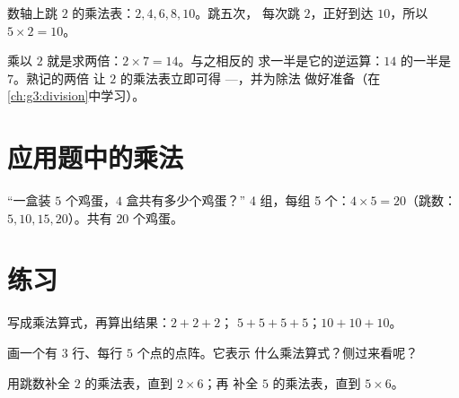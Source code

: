 \begin{omfigure}

{\small 数轴上跳 $2$ 的乘法表：$2, 4, 6, 8, 10$。跳五次，
每次跳 $2$，正好到达 $10$，所以 $5 \times 2 = 10$。}
\end{omfigure}

\begin{example}[两倍与一半]\label{ex:g2:mult:double}
乘以 $2$ 就是求两倍：$2 \times 7 = 14$。与之相反的
求一半是它的逆运算：$14$ 的一半是 $7$。熟记的两倍
让 $2$ 的乘法表立即可得 ---，并为除法
做好准备（在\cref{ch:g3:division}中学习）。
\end{example}

\section{应用题中的乘法}

\begin{example}\label{ex:g2:mult:problem}
“一盒装 $5$ 个鸡蛋，$4$ 盒共有多少个鸡蛋？”
4 组，每组 5 个：$4 \times 5 = 20$（跳数：$5, 10, 15, 20$）。共有
$20$ 个鸡蛋。
\end{example}

\section{练习}

\begin{exercise}[$\star$]\label{exo:g2:mult:1}
写成乘法算式，再算出结果：$2 + 2 + 2$；\quad
$5 + 5 + 5 + 5$；\quad $10 + 10 + 10$。
\end{exercise}

\begin{exercise}[$\star$]\label{exo:g2:mult:2}
画一个有 $3$ 行、每行 $5$ 个点的点阵。它表示
什么乘法算式？侧过来看呢？
\end{exercise}

\begin{exercise}[$\star$]\label{exo:g2:mult:3}
用跳数补全 $2$ 的乘法表，直到 $2 \times 6$；再
补全 $5$ 的乘法表，直到 $5 \times 6$。
\end{exercise}

